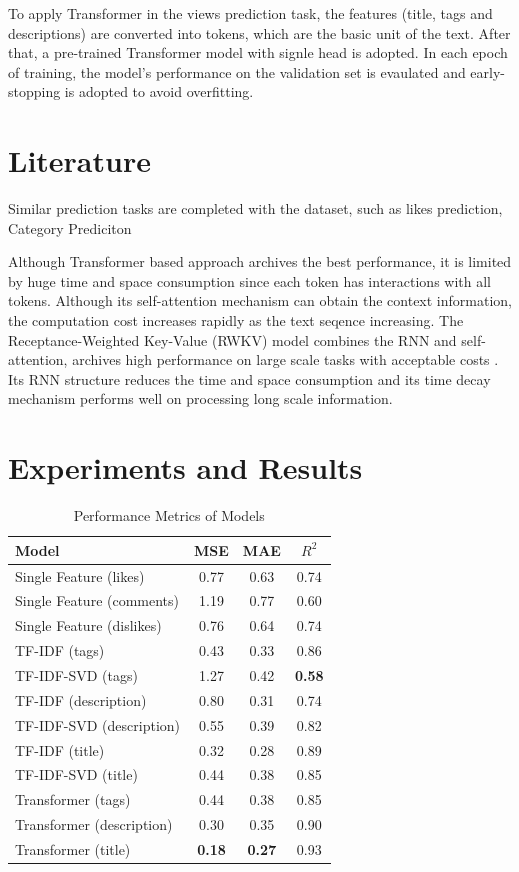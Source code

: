 \documentclass[sigplan,screen]{acmart}
\begin{document}
To apply Transformer in the views prediction task, the features (title, tags and descriptions) are converted into tokens, which are the basic unit of the text. After that, a pre-trained Transformer model with signle head is adopted. In each epoch of training, the model's performance on the validation set is evaulated and early-stopping is adopted to avoid overfitting.

\section{Literature}

Similar prediction tasks are completed with the dataset, such as likes prediction, Category Prediciton \cite{likespred,categorypred}

Although Transformer based approach archives the best performance, it is limited by huge time and space consumption since each token has interactions with all tokens. Although its self-attention mechanism can obtain the context information, the computation cost increases rapidly as the text seqence increasing. The Receptance-Weighted Key-Value (RWKV) model combines the RNN and self-attention, archives high performance on large scale tasks with acceptable costs \cite{peng2023rwkvreinventingrnnstransformer}. Its RNN structure reduces the time and space consumption and its time decay mechanism performs well on processing long scale information.

\section{Experiments and Results}
\begin{table}[H]
  \centering
  
  \caption{Performance Metrics of Models}
  \label{tab:model_metrics}
 
  \begin{tabular}{lccc}
  \toprule
  \textbf{Model} & \textbf{MSE} & \textbf{MAE} & \textbf{$R^2$} \\
  \midrule
  Single Feature (likes) & 0.77 & 0.63 & 0.74 \\
  Single Feature (comments) & 1.19 & 0.77 & 0.60 \\
  Single Feature (dislikes) & 0.76 & 0.64 & 0.74 \\
  TF-IDF (tags) & 0.43 & 0.33 & 0.86 \\
  TF-IDF-SVD (tags) & 1.27 & 0.42 & \bf{0.58} \\
  TF-IDF (description) & 0.80 & 0.31 & 0.74 \\
  TF-IDF-SVD (description) & 0.55 & 0.39 & 0.82 \\
  TF-IDF (title) & 0.32 & 0.28 & 0.89 \\
  TF-IDF-SVD (title) & 0.44 & 0.38 & 0.85 \\
  Transformer (tags) & 0.44 & 0.38 & 0.85 \\
  Transformer (description) & 0.30 & 0.35 & 0.90 \\
  Transformer (title) & \bf{0.18} & \bf{0.27} & 0.93 \\
  \bottomrule
  \end{tabular}%
  
\end{table}
\end{document}
